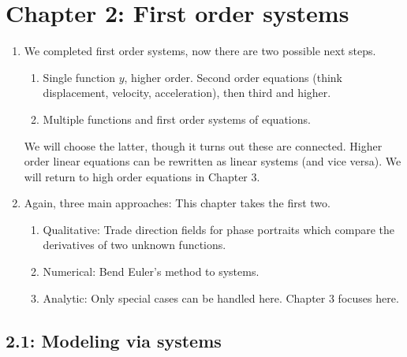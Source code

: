 \documentclass{article}
\begin{document}
\section{Chapter 2: First order systems}


\begin{enumerate}

\item We completed first order systems, now there are two possible next steps.
\begin{enumerate}
\item Single function $y$, higher order. Second order equations (think displacement, velocity, acceleration), then third and higher.
\item Multiple functions and first order systems of equations.
\end{enumerate}
We will choose the latter, though it turns out these are connected. Higher order linear equations can be rewritten as linear systems (and vice versa). We will return to high order equations in Chapter 3.


\item Again, three main approaches: This chapter takes the first two.
\begin{enumerate}
\item Qualitative: Trade direction fields for phase portraits which compare the derivatives of two unknown functions.
\item Numerical: Bend Euler's method to systems.
\item Analytic: Only special cases can be handled here. Chapter 3 focuses here.
\end{enumerate}

\end{enumerate}

\subsection{2.1: Modeling via systems}
\end{document}
